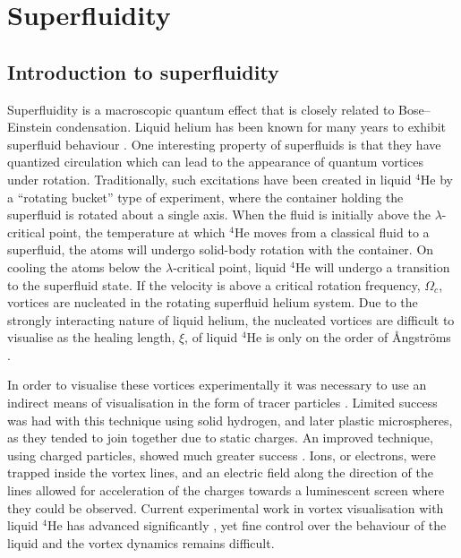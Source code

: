 \section{Superfluidity}\label{sec:superfluid}
\subsection{Introduction to superfluidity}

Superfluidity is a macroscopic quantum effect that is closely related to Bose--Einstein condensation. Liquid helium has been known for many years to exhibit superfluid behaviour \cite{BEC:Penrose_pr_1956}. One interesting property of superfluids is that they have quantized circulation which can lead to the appearance of quantum vortices under rotation. Traditionally, such excitations have been created in liquid $^4$He by a ``rotating bucket'' type of experiment, where the container holding the superfluid is rotated about a single axis. When the fluid is initially above the $\lambda$-critical point, the temperature at which $^4$He moves from a classical fluid to a superfluid, the atoms will undergo solid-body rotation with the container. On cooling the atoms below the $\lambda$-critical point, liquid $^4$He will undergo a transition to the superfluid state. If the velocity is above a critical rotation frequency, $\Omega_c$, vortices are nucleated in the rotating superfluid helium system. Due to the strongly interacting nature of liquid helium, the nucleated vortices are difficult to visualise as the healing length, $\xi$, of liquid $^4$He is only on the order of {\r{A}}ngstr{\"o}ms \cite{BEC:Srinivasen_pramana_2006}.

In order to visualise these vortices experimentally it was necessary to use an indirect means of visualisation in the form of tracer particles \cite{BEC:Packard_physb_1982}. Limited success was had with this technique using solid hydrogen, and later plastic microspheres, as they tended to join together due to static charges. An improved technique, using charged particles, showed much greater success \cite{Vtx:Packard_prl_1969}. Ions, or electrons, were trapped inside the vortex lines, and an electric field along the direction of the lines allowed for acceleration of the charges towards a luminescent screen where they could be observed. Current experimental work in vortex visualisation with liquid $^4$He has advanced significantly \cite{Vtx:Tsubota_arxiv_2010,Vtx:Guo_pnas_2014}, yet fine control over the behaviour of the liquid and the vortex dynamics remains difficult.

